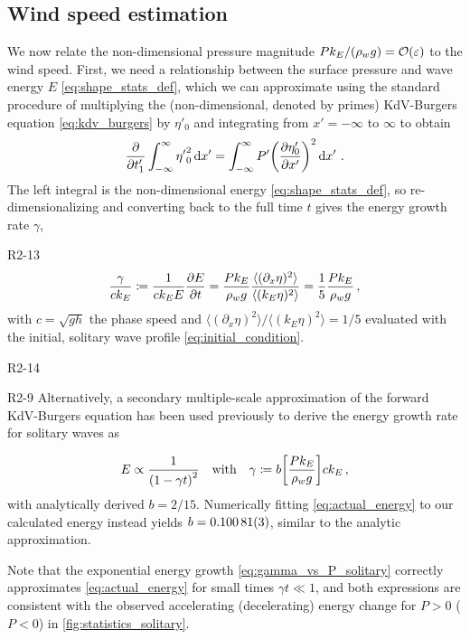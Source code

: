 \documentclass{jfm}
\renewcommand*{\epsilon}{\varepsilon}
\begin{document}
\subsection{\label{sec:press_mag} Wind speed estimation}
We now relate the non-dimensional pressure magnitude $P k_E/(\rho_w g) =
\order{\epsilon}$ to the wind speed.
First, we need a relationship between the surface pressure and wave
energy $E$ \cref{eq:shape_stats_def}, which we can approximate using the
standard procedure \citep[\eg][]{mei2005nonlinear} of multiplying the
(non-dimensional, denoted by primes) KdV-Burgers equation
\cref{eq:kdv_burgers} by $\eta'_0$ and integrating from $x'=-\infty$ to
$\infty$ to obtain
\begin{equation}
  \pdv{t'_1} \int_{-\infty}^{\infty} {\eta'}_0^2 \dd{x'}
  = \int_{-\infty}^{\infty} P' \pqty{\pdv{\eta'_0}{x'}}^2
  \dd{x'} \,.
  \label{eq:energy_nondim}
\end{equation}
The left integral is the non-dimensional energy
\cref{eq:shape_stats_def}, so re-dimensionalizing and converting back to
the full time $t$ gives the energy growth rate $\gamma$,
\begin{LineLabel}{R2-13}
\begin{equation}
  \frac{\gamma}{c k_E} \coloneqq
  \frac{1}{c k_E E} \pdv{E}{t}
  = \frac{P k_E}{\rho_w g} \frac{\langle (\partial_x \eta)^2 \rangle}
    {\langle (k_E \eta)^2 \rangle}
  = \frac{1}{5} \frac{P k_E}{\rho_w g}
  \,,
  \label{eq:gamma_vs_P_solitary}
\end{equation}
with $c = \sqrt{gh}$ the phase speed and $\langle (\partial_x \eta)^2
\rangle / \langle (k_E \eta)^2 \rangle = 1/5$ evaluated with the
initial, solitary wave profile \cref{eq:initial_condition}.
\end{LineLabel}
\begin{LineLabel}{R2-14}
\begin{LineLabel}{R2-9}
Alternatively, a secondary multiple-scale approximation of the
forward KdV-Burgers equation has been used previously to derive
the energy growth rate for solitary waves as~\citep{zdyrski2019effects}
\end{LineLabel}
\begin{equation}
  E \propto \frac{1}{\pqty{1 - \gamma t}^2}
  \qq{with}
  \gamma \coloneqq b \bqty{\frac{P k_E}{\rho_w g}} c k_E
  \,,
  \label{eq:actual_energy}
\end{equation}
with analytically derived $b = 2/15$.
Numerically fitting \cref{eq:actual_energy} to our calculated energy
instead yields $b = \num{0.10081 \pm 0.00003}$, similar to the analytic
approximation.
\end{LineLabel}
Note that the exponential energy growth \cref{eq:gamma_vs_P_solitary}
correctly approximates \cref{eq:actual_energy} for small times $\gamma t
\ll 1$, and both expressions are consistent with the observed
accelerating (decelerating) energy change for $P>0$ ($P<0$) in
\cref{fig:statistics_solitary}.
\end{document}
